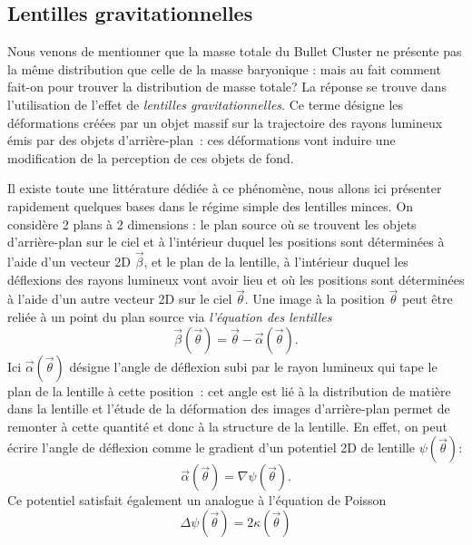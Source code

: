 \subsection{Lentilles gravitationnelles}
Nous venons de mentionner que la masse totale du Bullet Cluster ne présente pas la même distribution que celle de la masse baryonique : mais au fait comment fait-on pour trouver la distribution de masse totale? La réponse se trouve dans l'utilisation de l'effet de \textit{lentilles gravitationnelles}. Ce terme désigne les déformations créées par un objet massif sur la trajectoire des rayons lumineux émis par des objets d'arrière-plan~: ces déformations vont induire une modification de la perception de ces objets de fond.

Il existe toute une littérature dédiée à ce phénomène, nous allons ici présenter rapidement quelques bases dans le régime simple des lentilles minces. On considère 2 plans à 2 dimensions : le plan source où se trouvent les objets d'arrière-plan sur le ciel et à l'intérieur duquel les positions sont déterminées à l'aide d'un vecteur 2D $\vec{\beta}$, et le plan de la lentille, à l'intérieur duquel les déflexions des rayons lumineux vont avoir lieu et où les positions sont déterminées à l'aide d'un autre vecteur 2D sur le ciel $\vec{\theta}$. Une image à la position $\vec{\theta}$ peut être reliée à un point du plan source via \textit{l'équation des lentilles}
\begin{equation}
\vec{\beta}(\vec{\theta})=\vec{\theta}-\vec{\alpha}(\vec{\theta}).
\end{equation}
Ici $\vec{\alpha}(\vec{\theta})$ désigne l'angle de déflexion subi par le rayon lumineux qui tape le plan de la lentille à cette position~: cet angle est lié à la distribution de matière dans la lentille et l'étude de la déformation des images d'arrière-plan permet de remonter à cette quantité et donc à la structure de la lentille. En effet, on peut écrire l'angle de déflexion comme le gradient d'un potentiel 2D de lentille $\psi(\vec{\theta})$:
\begin{equation}
\vec{\alpha}(\vec{\theta})=\nabla \psi(\vec{\theta}).
\end{equation}
Ce potentiel satisfait également un analogue à l'équation de Poisson
\begin{equation}
\Delta \psi(\vec{\theta}) = 2 \kappa (\vec{\theta})
\end{equation}

